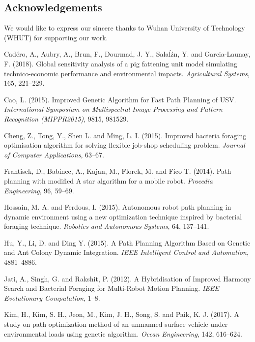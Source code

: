 \documentclass{PDS}%
\theoremstyle{definition}
\begin{document}
\begin{Backmatter}


\section*{Acknowledgements}
We would like to express our sincere thanks to Wuhan University of Technology (WHUT) for supporting our work.



\begin{thebibliography}{}

{Cad\'ero, A., Aubry, A., Brun, F.,   Dourmad, J. Y., Sala\'l\'zn, Y.  and Garcia-Launay, F.} (2018).
Global sensitivity analysis of a pig fattening unit model simulating technico-economic performance and environmental impacts.
\textit{Agricultural Systems}, {165}, 221--229.

{Cao, L.} (2015). Improved Genetic Algorithm for Fast Path Planning of USV.
\textit{International Symposium on Multispectral Image Processing and Pattern Recognition (MIPPR2015)}, 9815, 981529.

{Cheng, Z., Tong, Y., Shen L. and Ming, L. I.} (2015). Improved bacteria foraging optimisation algorithm for solving flexible job-shop scheduling problem.
\textit{Journal of Computer Applications}, 63--67.

{Frantisek, D., Babinec, A., Kajan, M., Florek, M. and Fico T.} (2014).
Path planning with modified A star algorithm for a mobile robot. \textit{Procedia Engineering}, {96}, 59--69.

{Hossain, M. A. and Ferdous, I.} (2015).
Autonomous robot path planning in dynamic environment using a new optimization technique inspired by bacterial foraging technique.
\textit{Robotics and Autonomous Systems}, {64}, 137--141.

{Hu, Y., Li, D. and Ding Y.} (2015). A Path Planning Algorithm Based on Genetic and Ant Colony Dynamic Integration.
\textit{IEEE Intelligent Control and Automation}, 4881--4886.

{Jati, A., Singh, G. and Rakshit, P.} (2012). A Hybridisation of Improved Harmony Search and Bacterial Foraging for Multi-Robot Motion Planning.
\textit{IEEE Evolutionary Computation}, 1--8.

{Kim, H., Kim, S. H., Jeon, M., Kim, J. H., Song, S. and Paik, K. J.} (2017).
A study on path optimization method of an unmanned surface vehicle under environmental loads using genetic algorithm.
\textit{Ocean Engineering}, {142}, 616--624.


\end{thebibliography}
\end{Backmatter}
\end{document}
